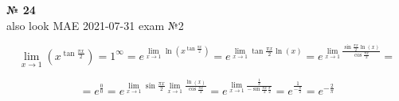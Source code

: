 \documentclass{article}
\begin{document}
\begin{enumerate}

\textbf{№ 24} 
\\
also look MAE 2021-07-31 exam №2

\begingroup
\Large

$$ \lim_{x\to 1} \left(x^{\tan{\frac{\pi x}{2}}}\right) 
= 1^{\infty} 
= e^{\lim\limits_{x \to 1}\ln(x^{\tan{\frac{\pi x}{2}}})} 
= e^{\lim\limits_{x \to 1}\tan{\frac{\pi x}{2}}\ln(x)} 
= e^{\lim\limits_{x \to 1}\frac{\sin{\frac{\pi x}{2}}\ln(x)}{\cos{\frac{\pi x}{2}}}}
= $$

$$ = e^{\frac{0}{0}}
= e^{\lim\limits_{x \to 1}\sin{\frac{\pi x}{2}}\lim\limits_{x \to 1}\frac{\ln(x)}{\cos{\frac{\pi x}{2}}}} 
= e^{\lim\limits_{x \to 1}\frac{\frac{1}{x}}{-\sin{\frac{\pi x}{2}}\frac{\pi}{2}}} 
= e^{\frac{1}{-\frac{\pi}{2}}}
= e^{-\frac{2}{\pi}} $$

\endgroup

\end{enumerate}
\end{document}
